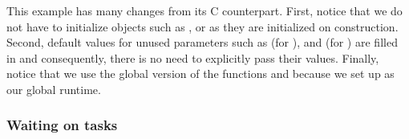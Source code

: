 This example has many changes from its C counterpart. First, notice that we do
not have to initialize objects such as ,  or
 as they are initialized on construction. Second, default values
for unused parameters such as  (for ),
 and  (for ) are filled in and
consequently, there is no need to explicitly pass their values. Finally,
notice that we use the global version of the functions  and
 because we set up  as our global runtime.

\subsubsection{Waiting on tasks}

